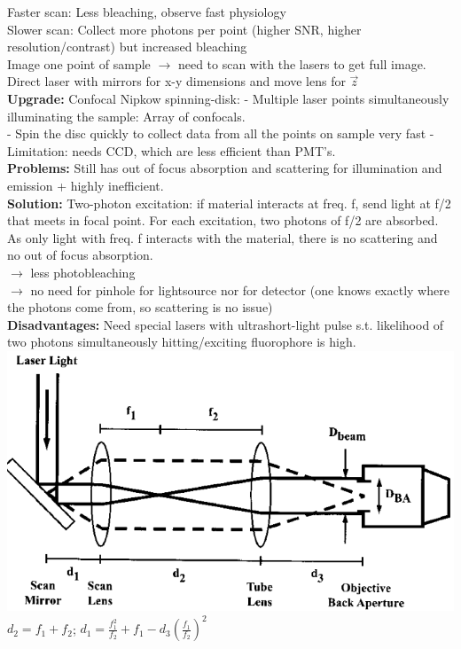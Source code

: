 \documentclass[9pt]{article}
\begin{document}
\begin{multicols}{2}
Faster scan: Less bleaching, observe fast physiology\\
Slower scan: Collect more photons per point (higher SNR, higher resolution/contrast) but increased bleaching\\
Image one point of sample $\rightarrow$ need to scan with the lasers to get full image. Direct laser with mirrors for x-y dimensions and move lens for $\vec{z}$\\
\textbf{Upgrade:} Confocal Nipkow spinning-disk: 
- Multiple laser points simultaneously illuminating the sample: Array of confocals.\\
- Spin the disc quickly to collect data from all the points on sample very fast
- Limitation: needs CCD, which are less efficient than PMT's.\\
\textbf{Problems:} Still has out of focus absorption and scattering for illumination and emission + highly inefficient.\\
\textbf{Solution:} Two-photon excitation: if material interacts at freq. f, send light at f/2 that meets in focal point. For each excitation, two photons of f/2 are absorbed. As only light with freq. f interacts with the material, there is no scattering and no out of focus absorption.\\
 $\rightarrow$ less photobleaching\\
 $\rightarrow$ no need for pinhole for lightsource nor for detector (one knows exactly where the photons come from, so scattering is no issue)\\
 \textbf{Disadvantages:} Need special lasers with ultrashort-light pulse s.t. likelihood of two photons simultaneously hitting/exciting fluorophore is high.\\
 \includegraphics[scale=0.15]{Images/2ph_microscope.png}
$d_2=f_1+f_2$; $d_1=\frac{f_1^2}{f_2}+f_1-d_3(\frac{f_1}{f_2})^2$

\end{multicols}
\end{document}
